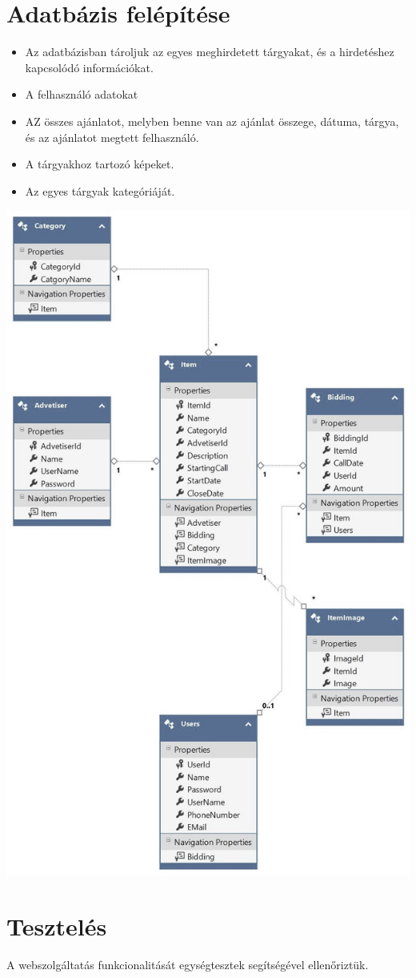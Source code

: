 \documentclass[12pt,a4paper]{article}
\begin{document}
\section{Adatbázis felépítése}
\begin{itemize}
\item Az adatbázisban tároljuk az egyes meghirdetett tárgyakat, és a hirdetéshez kapcsolódó információkat.
\item A felhasználó adatokat
\item AZ összes ajánlatot, melyben benne van az ajánlat összege, dátuma, tárgya, és az ajánlatot megtett felhasználó.
\item A tárgyakhoz tartozó képeket.
\item Az egyes tárgyak kategóriáját.
\end{itemize}
\includegraphics[scale=0.5]{entity_connect.jpg}

\section{Tesztelés}
A webszolgáltatás funkcionalitását egységtesztek segítségével ellenőriztük.
\end{document}
